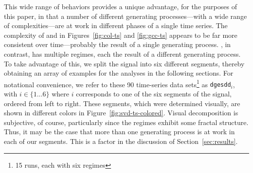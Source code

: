 This wide range of behaviors provides a unique advantage, for the
purposes of this paper, in that a number of different generating
processes---with a wide range of complexities---are at work in
different phases of a single time series.  The complexity of \col and
\gcc in Figures~\ref{fig:col-ts} and \ref{fig:gcc-ts} appears to be
far more consistent over time---probably the result of a single
generating process.  \svd, in contrast, has multiple regimes, each the
result of a different generating process.  To take advantage of this,
we split the signal into six different segments, thereby obtaining an
array of examples for the analyses in the following sections.  For
notational convenience, we refer to these 90 time-series data
sets\footnote{15 runs, each with six regimes} as {\tt dgesdd$_i$},
with $i \in \{1\dots6\}$ where $i$ corresponds to one of the six
segments of the signal, ordered from left to right.  These segments,
which were determined visually, are shown in different colors in
Figure~\ref{fig:svd-ts-colored}.  Visual decomposition is subjective,
of course, particularly since the regimes exhibit some fractal
structure.  Thus, it may be the case that more than one generating
process is at work in each of our segments.  This is a factor in the
discussion of Section~\ref{sec:results}.

